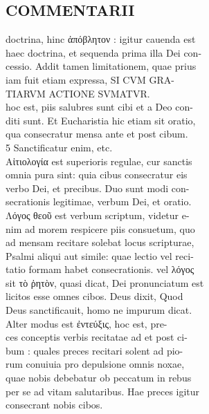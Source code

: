 \documentclass{article}
\begin{document}
\begin{pages}
\section*{COMMENTARII \\
                }
doctrina, hinc ἀπόβλητον : igitur cauenda est \\
                haec doctrina, et sequenda prima illa Dei con- \\
                cessio. Addit tamen limitationem, quae prius \\
                iam fuit etiam expressa, SI CVM GRA- \\
                TIARVM ACTIONE SVMATVR. \\
                hoc est, piis salubres sunt cibi et a Deo con- \\
                diti sunt. Et Eucharistia hic etiam sit oratio, \\
                qua consecratur mensa ante et post cibum. \\
                5 Sanctificatur enim, etc. \\
                Αἰτιολογία est superioris regulae, cur sanctis \\
                omnia pura sint: quia cibus consecratur eis \\
                verbo Dei, et precibus. Duo sunt modi con- \\
                secrationis legitimae, verbum Dei, et oratio. \\
                Λόγος θεοῦ est verbum scriptum, videtur e- \\
                nim ad morem respicere piis consuetum, quo \\
                ad mensam recitare solebat locus scripturae, \\
                Psalmi aliqui aut simile: quae lectio vel reci- \\
                tatio formam habet consecrationis. vel λόγος \\
                sit τὸ ῤητὸν, quasi dicat, Dei pronunciatum est \\
                licitos esse omnes cibos. Deus dixit, Quod \\
                Deus sanctificauit, homo ne impurum dicat. \\
                Alter modus est ἐντεύξις, hoc est, pre- \\
                ces conceptis verbis recitatae ad et post ci- \\
                bum : quales preces recitari solent ad pio- \\
                rum conuiuia pro depulsione omnis noxae, \\
                quae nobis debebatur ob peccatum in rebus \\
                per se ad vitam salutaribus. Hae preces igitur \\
                consecrant nobis cibos. \\
                

\end{pages}
\end{document}
